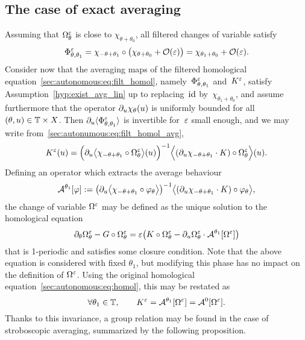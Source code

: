 \subsection{The case of exact averaging}

Assuming that $\Omega^\varepsilon_\theta$ is close to $\chi_{\theta +
\theta_0}$, all filtered changes of variable satisfy
\begin{equation*}
  \Phi^\varepsilon_{\theta, \theta_1} 
  = \chi_{-\theta + \theta_1} 
    \circ \big( \chi_{\theta + \theta_0} + \mathcal{O}( \varepsilon ) \big)
  = \chi_{\theta_1 + \theta_0} + \mathcal{O}(\varepsilon) .
\end{equation*}
Consider now that the averaging maps of the filtered homological
equation~\eqref{sec:autonomous:eq:filt_homol}, namely~$\Phi^\varepsilon
_{\theta, \theta_1}$ and~$K^\varepsilon$, satisfy
Assumption~\ref{hyp:exist_avg_lin} up to replacing~$\operatorname{id}$
by~$\chi_{\theta_1 + \theta_0}$, and assume furthermore that the
operator $\partial_u \chi_\theta(u)$ is uniformly bounded for all~$(\theta,
u) \in \mathbb{T} \times X$. Then $\partial_u \langle \Phi^\varepsilon _{\theta, \theta_1} \rangle$
is invertible for~$\varepsilon$ small enough, and we may write
from~\eqref{sec:autonumous:eq:filt_homol_avg}, 
\begin{equation} \label{sec:autonomous:eq:filt_avg_map}
  K^\varepsilon(u) = 
  \Big( \partial_u \big \langle \chi_{-\theta+\theta_1} 
    \circ \Omega^\varepsilon _\theta \big \rangle (u) \Big) ^{-1}
  \Big \langle (\partial_u \chi_{-\theta+\theta_1} \cdot K) 
    \circ \Omega^\varepsilon _\theta \Big \rangle (u) .
\end{equation}
Defining an operator which extracts the average behaviour 
\begin{equation} \label{sec:autonomous:def:avg_op}
  \mathcal{A}^{\theta_1}[\varphi] := 
  \big( \partial_u \big \langle \chi_{-\theta+\theta_1} 
    \circ \varphi_\theta \big \rangle \big) ^{-1} 
  \big \langle (\partial_u \chi_{-\theta+\theta_1} \cdot K) 
    \circ \varphi _\theta \big \rangle , 
\end{equation}
the change of variable $\Omega^\varepsilon$ may be
defined as the unique solution to the homological equation 
\begin{equation} \label{sec:autonomous:eq:only_Omega_homol}
  \partial_\theta \Omega^\varepsilon _\theta - G \circ \Omega^\varepsilon _\theta
  = \varepsilon \big( K \circ \Omega^\varepsilon _\theta 
    - \partial_u \Omega^\varepsilon _\theta \cdot \mathcal{A}^{\theta_1}[\Omega^\varepsilon] 
  \big) 
\end{equation}
that is 1-periodic and satisfies some closure condition. Note that the
above equation is considered with fixed $\theta_1$, but modifying this
phase has no impact on the definition of $\Omega^\varepsilon$. Using the
original homological equation~\eqref{sec:autonomous:eq:homol}, this may
be restated as
\begin{equation*}
  \forall \theta_1 \in \mathbb{T}, \qquad
  K^\varepsilon = \mathcal{A}^{\theta_1}[\Omega^\varepsilon] 
  = \mathcal{A}^{0}[\Omega^\varepsilon] . 
\end{equation*}
Thanks to this invariance, a group relation may be found in the case of
stroboscopic averaging, summarized by the following proposition.

